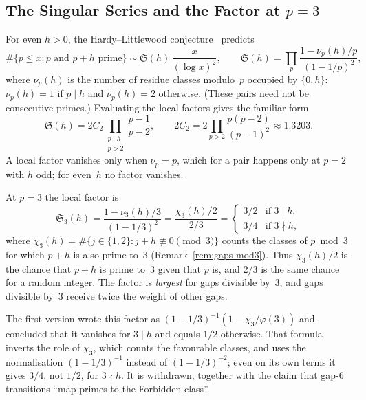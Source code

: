 \documentclass[12pt,a4paper]{article}
\theoremstyle{plain}
\theoremstyle{definition}
\theoremstyle{remark}
\begin{document}
\subsection{The Singular Series and the Factor at \texorpdfstring{$p = 3$}{p = 3}}
\label{sec:singular}

For even $h > 0$, the Hardy--Littlewood conjecture~\cite{HL23} predicts
\[
  \#\{p \leq x : p \text{ and } p + h \text{ prime}\} \sim \mathfrak{S}(h)\,
  \frac{x}{(\log x)^2},
  \qquad
  \mathfrak{S}(h) = \prod_{p} \frac{1 - \nu_p(h)/p}{(1 - 1/p)^2},
\]
where $\nu_p(h)$ is the number of residue classes modulo~$p$ occupied by $\{0, h\}$:
$\nu_p(h) = 1$ if $p \mid h$ and $\nu_p(h) = 2$ otherwise. (These pairs need not be
consecutive primes.) Evaluating the local factors gives the familiar form
\[
  \mathfrak{S}(h) = 2C_2 \prod_{\substack{p \mid h \\ p > 2}} \frac{p-1}{p-2},
  \qquad
  2C_2 = 2\prod_{p > 2}\frac{p(p-2)}{(p-1)^2} \approx 1.3203 .
\]
A local factor vanishes only when $\nu_p = p$, which for a pair happens only at $p = 2$
with $h$ odd; for even~$h$ no factor vanishes.

\begin{correctionbox}
\noindent At $p = 3$ the local factor is
\[
  \mathfrak{S}_3(h) = \frac{1 - \nu_3(h)/3}{(1 - 1/3)^2}
  = \frac{\chi_3(h)/2}{2/3}
  = \begin{cases}
    3/2 & \text{if } 3 \mid h, \\
    3/4 & \text{if } 3 \nmid h,
  \end{cases}
\]
where $\chi_3(h) = \#\{j \in \{1, 2\} : j + h \not\equiv 0 \pmod 3\}$ counts the
classes of $p \bmod 3$ for which $p + h$ is also prime to~3
(Remark~\ref{rem:gaps-mod3}). Thus $\chi_3(h)/2$ is the chance that $p + h$ is prime
to~3 given that $p$ is, and $2/3$ is the same chance for a random integer. The factor
is \emph{largest} for gaps divisible by~3, and gaps divisible by~3 receive twice the
weight of other gaps.
\end{correctionbox}

The first version wrote this factor as $(1 - 1/3)^{-1}(1 - \chi_3/\varphi(3))$ and
concluded that it vanishes for $3 \mid h$ and equals $1/2$ otherwise. That formula
inverts the role of $\chi_3$, which counts the favourable classes, and uses the
normalisation $(1-1/3)^{-1}$ instead of $(1-1/3)^{-2}$; even on its own terms it gives
$3/4$, not $1/2$, for $3 \nmid h$. It is withdrawn, together with the claim that gap-6
transitions ``map primes to the Forbidden class''.
\end{document}
